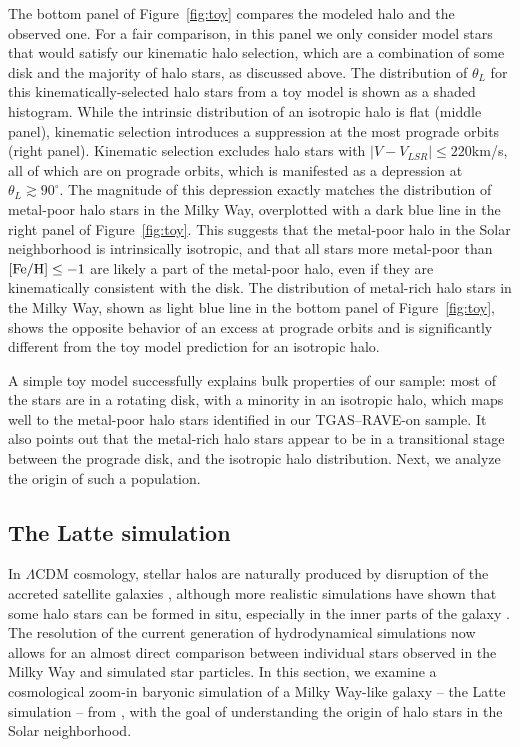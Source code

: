 \documentclass[apj, twocolappendix, numberedappendix, appendixfloats]{emulateapj}
\begin{document}
The bottom panel of Figure~\ref{fig:toy} compares the modeled halo and the observed one.
For a fair comparison, in this panel we only consider model stars that would satisfy our kinematic halo selection, which are a combination of some disk and the majority of halo stars, as discussed above.
The distribution of $\theta_L$ for this kinematically-selected halo stars from a toy model is shown as a shaded histogram.
While the intrinsic distribution of an isotropic halo is flat (middle panel), kinematic selection introduces a suppression at the most prograde orbits (right panel).
Kinematic selection excludes halo stars with $|V-V_{LSR}|\leq220$\;km/s, all of which are on prograde orbits, which is manifested as a depression at $\theta_L\gtrsim90^\circ$.
The magnitude of this depression exactly matches the distribution of metal-poor halo stars in the Milky Way, overplotted with a dark blue line in the right panel of Figure~\ref{fig:toy}.
This suggests that the metal-poor halo in the Solar neighborhood is intrinsically isotropic, and that all stars more metal-poor than $\rm[Fe/H]\leq-1$ are likely a part of the metal-poor halo, even if they are kinematically consistent with the disk.
The distribution of metal-rich halo stars in the Milky Way, shown as light blue line in the bottom panel of Figure~\ref{fig:toy}, shows the opposite behavior of an excess at prograde orbits and is significantly different from the toy model prediction for an isotropic halo.

A simple toy model successfully explains bulk properties of our sample: most of the stars are in a rotating disk, with a minority in an isotropic halo, which maps well to the metal-poor halo stars identified in our TGAS--RAVE-on sample.
It also points out that the metal-rich halo stars appear to be in a transitional stage between the prograde disk, and the isotropic halo distribution.
Next, we analyze the origin of such a population.

\subsection{The Latte simulation}
\label{sec:latte}
In $\Lambda$CDM cosmology, stellar halos are naturally produced by disruption of the accreted satellite galaxies \citep[e.g.,][]{bj2005, johnston2008}, although more realistic simulations have shown that some halo stars can be formed in situ, especially in the inner parts of the galaxy \citep[e.g.,][]{zolotov2009}.
The resolution of the current generation of hydrodynamical simulations now allows for an almost direct comparison between individual stars observed in the Milky Way and simulated star particles.
In this section, we examine a cosmological zoom-in baryonic simulation of a Milky Way-like galaxy -- the Latte simulation -- from \citet{wetzel2016}, with the goal of understanding the origin of halo stars in the Solar neighborhood.
\end{document}

